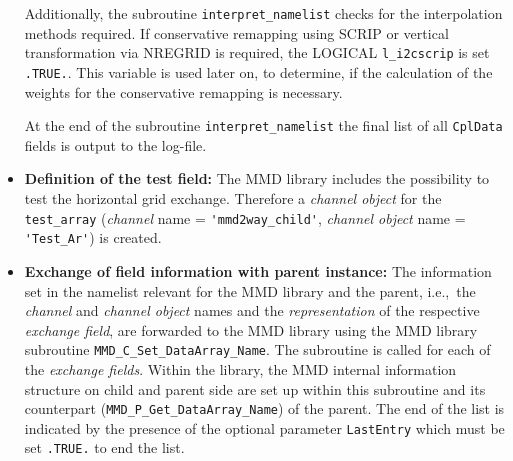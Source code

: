 \documentclass[11pt,twoside]{article}
\begin{document}
\begin{itemize}
Additionally, the subroutine \verb|interpret_namelist| checks for the
interpolation methods required. If conservative remapping using SCRIP
or vertical transformation via NREGRID is required, the {\footnotesize LOGICAL }
\verb|l_i2cscrip| is set \verb|.TRUE.|. This variable is used later
on, to determine, if the calculation of the weights for the
conservative remapping is necessary.

At the end of the subroutine \verb|interpret_namelist| the final list
of all \verb|CplData| fields is output to the log-file.

\item {\bf Definition of the test field:}
 The MMD library includes the possibility to test the horizontal grid 
exchange. Therefore a {\it channel object} for the 
\verb|test_array| ({\it channel} name = 
\verb|'mmd2way_child'|, {\it channel object} name =  \verb|'Test_Ar'|) is
created.   

\item {\bf Exchange of field information with parent instance:} 
The information set in the namelist  relevant for the MMD library
 and the parent, i.e.,\ the {\it channel} and {\it channel object} names 
and the {\it representation} of the respective {\it exchange field},
 are forwarded to the  
MMD library using the MMD library subroutine \verb|MMD_C_Set_DataArray_Name|.
The subroutine is called for each of the {\it exchange fields}. 
Within the library, the MMD internal information structure on child and parent
 side are set up within this subroutine and its counterpart 
(\verb|MMD_P_Get_DataArray_Name|) of the parent.
The end of the list is indicated by the presence of the optional parameter
\verb|LastEntry| which must be set \verb|.TRUE.| to end the list.


\end{itemize}
\end{document}
